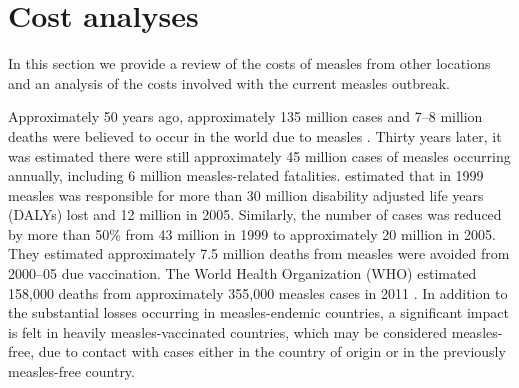 \documentclass{article}
\begin{document}
\section{Cost analyses}

In this section we provide a review of the costs of measles from other locations and an analysis of the costs involved with the current measles outbreak.

Approximately 50 years ago, approximately 135 million cases and 7--8 million deaths were believed to occur in the world due to measles \citep{clements4}. Thirty years later, it was estimated there were still approximately 45 million cases of measles occurring annually, including 6 million measles-related fatalities. \citep{wolfson7} estimated that in 1999 measles was responsible for more than 30 million disability adjusted life years (DALYs) lost and 12 million in 2005. Similarly, the number of cases was reduced by more than 50\% from 43 million in 1999 to approximately 20 million in 2005. They estimated approximately 7.5 million deaths from measles were avoided from 2000--05 due vaccination. The World Health Organization (WHO) estimated 158,000 deaths from approximately 355,000 measles cases in 2011 \citep{who13}.  In addition to the substantial losses occurring in measles-endemic countries, a significant impact is felt in heavily measles-vaccinated countries, which may be considered measles-free, due to contact with cases either in the country of origin or in the previously measles-free country.
\end{document}
